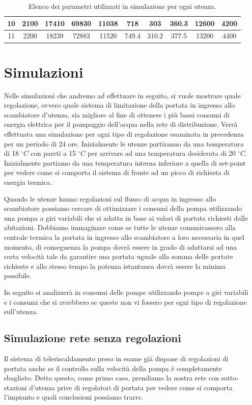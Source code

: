 \documentclass[laurea,oneside,11pt]{USiena_tesiLM}
\begin{document}
\begin{table}[!ht]
{\begin{tabular}{|c|c|c|c|c|c|c|c|c|c|}
10              & 2100                                     & 17410        & 69830        & 11038       & 718         & 303         & 360.3       & 12600       & 4200        \\ \hline
11              & 2200                                     & 18239        & 72883        & 11520       & 749.4       & 310.2       & 377.5       & 13200       & 4400        \\ \hline
\end{tabular}}
\caption{Elenco dei parametri utilizzati in simulazione per ogni utenza.}
\label{tab:par_utenze}
\end{table}

\section{Simulazioni}
Nelle simulazioni che andremo ad effettuare in seguito, si vuole mostrare quale regolazione, ovvero quale sistema di limitazione della portata in ingresso allo scambiatore d'utenza, sia migliore al fine di ottenere i più bassi consumi di energia elettrica per il pompaggio dell'acqua nella rete di distribuzione. Verrà effettuata una simulazione per ogni tipo di regolazione esaminata in precedenza per un periodo di 24 ore. Inizialmente le utenze partiranno da una temperatura di 18 $^{\circ}C$ con pareti a 15 $^{\circ}C$ per arrivare ad una temperatura desiderata di 20 $^{\circ}C$. Inizialmente partiamo da una temperatura interna inferiore a quella di set-point per vedere come si comporta il sistema di fronte ad un picco di richiesta di energia termica.

Quando le utenze hanno regolazioni sul flusso di acqua in ingresso allo scambiatore possiamo cercare di ottimizzare i consumi della pompa utilizzando una pompa a giri variabili che si adatta in base ai valori di portata richiesti dalle abitazioni. Dobbiamo immaginare come se tutte le utenze comunicassero alla centrale termica la portata in ingresso allo scambiatore a loro necessaria in quel momento, di conseguenza la pompa dovrà essere in grado di adattarsi ad una certa velocità tale da garantire una portata uguale alla somma delle portate richieste e allo stesso tempo la potenza istantanea dovrà essere la minima possibile.

In seguito si analizzerà in consumi delle pompe utilizzando pompe a giri variabili e i consumi che si avrebbero se queste non vi fossero per ogni tipo di regolazione sull'utenza. 

\subsection{Simulazione rete senza regolazioni}
Il sistema di teleriscaldamento preso in esame già dispone di regolazioni di portata anche se il controllo sulla velocità della pompa è completamente sbagliato. Detto questo, come primo caso, prendiamo la nostra rete con sotto-stazioni d'utenza prive di regolatori di portata per vedere come si comporta l'impianto e quali conclusioni possiamo trarre. 
\end{document}

